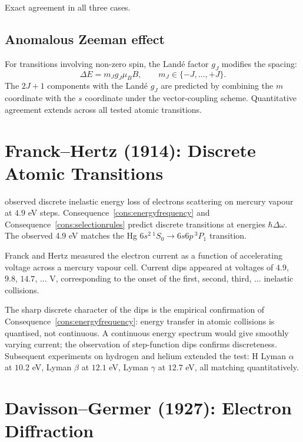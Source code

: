 Exact agreement in all three cases.

\subsection{Anomalous Zeeman effect}

For transitions involving non-zero spin, the Land\'{e} factor $g_{J}$
modifies the spacing:
\begin{equation*}
  \Delta E = m_{J} g_{J} \mu_{B} B,\qquad
  m_{J}\in\{-J,\ldots,+J\}.
\end{equation*}
The $2J+1$ components with the Land\'{e} $g_{J}$ are predicted by
combining the $m$ coordinate with the $s$ coordinate under the
vector-coupling scheme.  Quantitative agreement extends across all tested
atomic transitions.

\section{Franck--Hertz (1914): Discrete Atomic Transitions}
\label{sec:franckhertz-ch25}

\citet{frankhertz1914} observed discrete inelastic energy loss of electrons
scattering on mercury vapour at $4.9$ eV steps.
Consequence~\ref{cons:energyfrequency} and Consequence~\ref{cons:selectionrules}
predict discrete transitions at energies $\hbar\Delta\omega$.  The observed
4.9 eV matches the Hg $6s^{2}\,{}^{1}S_{0}\to 6s6p\,{}^{3}P_{1}$ transition.

Franck and Hertz measured the electron current as a function of accelerating
voltage across a mercury vapour cell.  Current dips appeared at voltages of
$4.9$, $9.8$, $14.7$, $\ldots$ V, corresponding to the onset of the first,
second, third, $\ldots$ inelastic collisions.

The sharp discrete character of the dips is the empirical confirmation of
Consequence~\ref{cons:energyfrequency}: energy transfer in atomic collisions
is quantised, not continuous.  A continuous energy spectrum would give
smoothly varying current; the observation of step-function dips confirms
discreteness.  Subsequent experiments on hydrogen and helium extended the
test: H Lyman $\alpha$ at $10.2$ eV, Lyman $\beta$ at $12.1$ eV, Lyman
$\gamma$ at $12.7$ eV, all matching quantitatively.

\section{Davisson--Germer (1927): Electron Diffraction}
\label{sec:dg-ch25}

